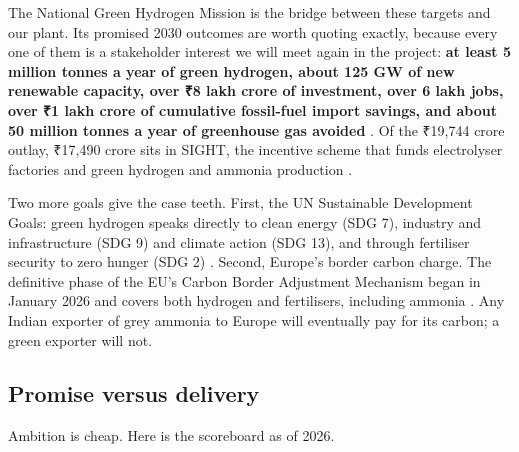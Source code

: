 The National Green Hydrogen Mission is the bridge between these targets and our plant. Its promised 2030 outcomes are worth quoting exactly, because every one of them is a stakeholder interest we will meet again in the project: \textbf{at least 5 million tonnes a year of green hydrogen, about 125 GW of new renewable capacity, over ₹8 lakh crore of investment, over 6 lakh jobs, over ₹1 lakh crore of cumulative fossil-fuel import savings, and about 50 million tonnes a year of greenhouse gas avoided} \cite{govnow2023}. Of the ₹19,744 crore outlay, ₹17,490 crore sits in SIGHT, the incentive scheme that funds electrolyser factories and green hydrogen and ammonia production \cite{govnow2023}. \confH

Two more goals give the case teeth. First, the UN Sustainable Development Goals: green hydrogen speaks directly to clean energy (SDG 7), industry and infrastructure (SDG 9) and climate action (SDG 13), and through fertiliser security to zero hunger (SDG 2) \cite{unsdg}. Second, Europe's border carbon charge. The definitive phase of the EU's Carbon Border Adjustment Mechanism began in January 2026 and covers both hydrogen and fertilisers, including ammonia \cite{coolset}. Any Indian exporter of grey ammonia to Europe will eventually pay for its carbon; a green exporter will not. \confH

\subsection{Promise versus delivery}

Ambition is cheap. Here is the scoreboard as of 2026.

\begin{center}
\end{center}

